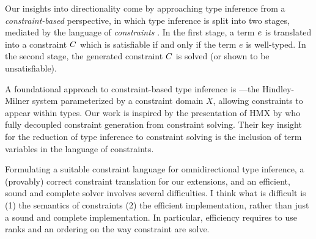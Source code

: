 \documentclass[acmsmall,screen,nonacm]{acmart}
\begin{document}





Our insights into directionality come by approaching type inference from a
\textit{constraint-based} \citep{TODO} perspective, in which type inference
is split into two stages, mediated by the language of \textit{constraints}
\citep{TODO}.  In the first stage, a term $e$ is translated into a constraint
$C$ which is satisfiable if and only if the term $e$ is well-typed. In the
second stage, the generated constraint $C$ is solved (or shown to be
unsatisfiable).


A foundational approach to constraint-based type inference is \HMX
\cite{Odersky-Sulzmann-Wehr@tpos}---the Hindley-Milner system parameterized
by a constraint domain $X$, allowing constraints to appear within types. Our
work is inspired by the presentation of HMX by \citet{Pottier-Remy/emlti}
who fully decoupled constraint generation from constraint solving.  Their
key insight for the reduction of type inference to constraint solving is the
inclusion of term variables in the language of constraints.

Formulating a suitable constraint language for omnidirectional type
inference, a (provably) correct constraint translation for our extensions,
and an efficient, sound and complete solver involves several difficulties.
\Xdidier
{I think what is difficult is (1) the semantics of constraints (2) the
efficient implementation, rather than just a sound and complete
implementation. In particular, efficiency requires to use ranks and an
ordering on the way constraint are solve.}
\end{document}

